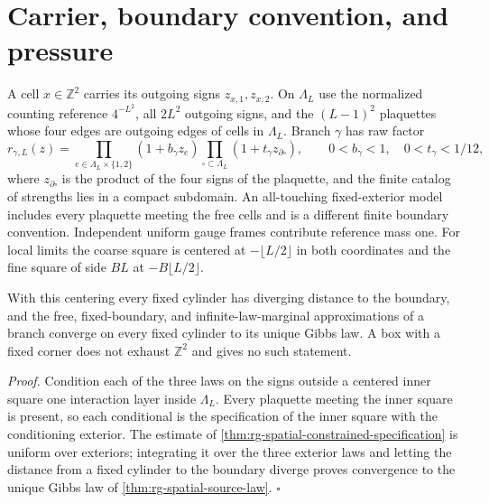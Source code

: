 \section{Carrier, boundary convention, and pressure}
\label{sec:rg-pressure-carrier}

A cell $x\in\mathbb Z^2$ carries its outgoing signs $z_{x,1},z_{x,2}$. On
$\Lambda_L$ use the normalized counting reference $4^{-L^2}$, all $2L^2$
outgoing signs, and the $(L-1)^2$ plaquettes whose four edges are outgoing
edges of cells in $\Lambda_L$. Branch $\gamma$ has raw factor
\begin{equation}
 r_{\gamma,L}(z)=\prod_{e\in\Lambda_L\times\{1,2\}}(1+b_\gamma z_e)
 \prod_{\square\subset\Lambda_L}(1+t_\gamma z_{\partial\square}),
 \qquad 0<b_\gamma<1,\quad 0<t_\gamma<1/12,
 \label{eq:rg-pressure-native-factor}
\end{equation}
where $z_{\partial\square}$ is the product of the four signs of the
plaquette, and the finite catalog of strengths lies in a compact subdomain.
An all-touching fixed-exterior model includes every plaquette meeting the
free cells and is a different finite boundary convention. Independent
uniform gauge frames contribute reference mass one. For local limits the
coarse square is centered at $-\lfloor L/2\rfloor$ in both coordinates and
the fine square of side $BL$ at $-B\lfloor L/2\rfloor$.

With this centering every fixed cylinder has diverging distance to the
boundary, and the free, fixed-boundary, and infinite-law-marginal
approximations of a branch converge on every fixed cylinder to its unique
Gibbs law. A box with a fixed corner does not exhaust $\mathbb Z^2$ and gives
no such statement. 

\noindent\emph{Proof.}
Condition each of the three laws on the signs outside a centered inner square
one interaction layer inside $\Lambda_L$. Every plaquette meeting the inner
square is present, so each conditional is the specification of the inner
square with the conditioning exterior. The estimate of
\cref{thm:rg-spatial-constrained-specification} is uniform over exteriors;
integrating it over the three exterior laws and letting the distance from a
fixed cylinder to the boundary diverge proves convergence to the unique
Gibbs law of \cref{thm:rg-spatial-source-law}. $\square$

